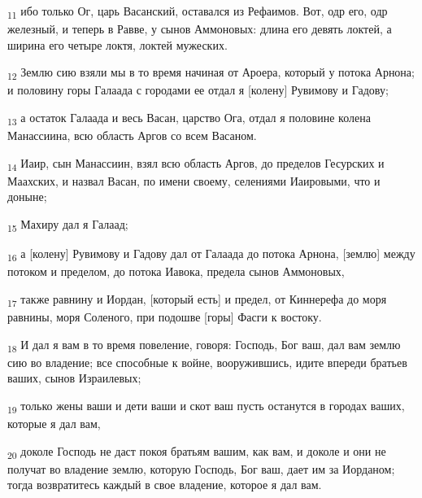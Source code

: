\begin{tcolorbox}
\textsubscript{11} ибо только Ог, царь Васанский, оставался из Рефаимов. Вот, одр его, одр железный, и теперь в Равве, у сынов Аммоновых: длина его девять локтей, а ширина его четыре локтя, локтей мужеских.
\end{tcolorbox}
\begin{tcolorbox}
\textsubscript{12} Землю сию взяли мы в то время начиная от Ароера, который у потока Арнона; и половину горы Галаада с городами ее отдал я [колену] Рувимову и Гадову;
\end{tcolorbox}
\begin{tcolorbox}
\textsubscript{13} а остаток Галаада и весь Васан, царство Ога, отдал я половине колена Манассиина, всю область Аргов со всем Васаном.
\end{tcolorbox}
\begin{tcolorbox}
\textsubscript{14} Иаир, сын Манассиин, взял всю область Аргов, до пределов Гесурских и Маахских, и назвал Васан, по имени своему, селениями Иаировыми, что и доныне;
\end{tcolorbox}
\begin{tcolorbox}
\textsubscript{15} Махиру дал я Галаад;
\end{tcolorbox}
\begin{tcolorbox}
\textsubscript{16} а [колену] Рувимову и Гадову дал от Галаада до потока Арнона, [землю] между потоком и пределом, до потока Иавока, предела сынов Аммоновых,
\end{tcolorbox}
\begin{tcolorbox}
\textsubscript{17} также равнину и Иордан, [который есть] и предел, от Киннерефа до моря равнины, моря Соленого, при подошве [горы] Фасги к востоку.
\end{tcolorbox}
\begin{tcolorbox}
\textsubscript{18} И дал я вам в то время повеление, говоря: Господь, Бог ваш, дал вам землю сию во владение; все способные к войне, вооружившись, идите впереди братьев ваших, сынов Израилевых;
\end{tcolorbox}
\begin{tcolorbox}
\textsubscript{19} только жены ваши и дети ваши и скот ваш пусть останутся в городах ваших, которые я дал вам,
\end{tcolorbox}
\begin{tcolorbox}
\textsubscript{20} доколе Господь не даст покоя братьям вашим, как вам, и доколе и они не получат во владение землю, которую Господь, Бог ваш, дает им за Иорданом; тогда возвратитесь каждый в свое владение, которое я дал вам.
\end{tcolorbox}
